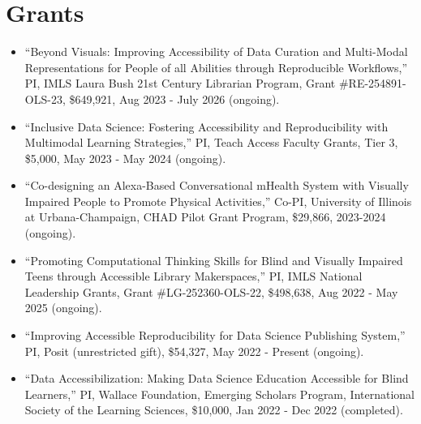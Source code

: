 \documentclass[11pt,a4paper,]{awesome-cv}
\begin{document}
\begin{cventries}
    \vspace{-4.0mm}
    \vspace{-4.0mm}
    \vspace{-4.0mm}
    \vspace{-4.0mm}
    \vspace{-4.0mm}
\end{cventries}

\hypertarget{grants}{%
\section{Grants}\label{grants}}

\begin{itemize}
\item
  ``Beyond Visuals: Improving Accessibility of Data Curation and
  Multi-Modal Representations for People of all Abilities through
  Reproducible Workflows,'' PI, IMLS Laura Bush 21st Century Librarian
  Program, Grant \#RE-254891-OLS-23, \$649,921, Aug 2023 - July 2026
  (ongoing).
\item
  ``Inclusive Data Science: Fostering Accessibility and Reproducibility
  with Multimodal Learning Strategies,'' PI, Teach Access Faculty
  Grants, Tier 3, \$5,000, May 2023 - May 2024 (ongoing).
\item
  ``Co-designing an Alexa-Based Conversational mHealth System with
  Visually Impaired People to Promote Physical Activities,'' Co-PI,
  University of Illinois at Urbana-Champaign, CHAD Pilot Grant Program,
  \$29,866, 2023-2024 (ongoing).
\item
  ``Promoting Computational Thinking Skills for Blind and Visually
  Impaired Teens through Accessible Library Makerspaces,'' PI, IMLS
  National Leadership Grants, Grant \#LG-252360-OLS-22, \$498,638, Aug
  2022 - May 2025 (ongoing).
\item
  ``Improving Accessible Reproducibility for Data Science Publishing
  System,'' PI, Posit (unrestricted gift), \$54,327, May 2022 - Present
  (ongoing).
\item
  ``Data Accessibilization: Making Data Science Education Accessible for
  Blind Learners,'' PI, Wallace Foundation, Emerging Scholars Program,
  International Society of the Learning Sciences, \$10,000, Jan 2022 -
  Dec 2022 (completed).
\end{itemize}
\end{document}
